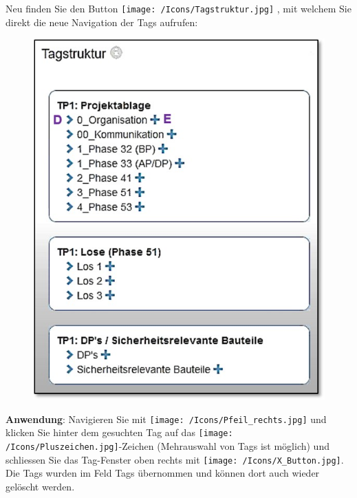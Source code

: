 Neu finden Sie  den Button \texttt{[image: /Icons/Tagstruktur.jpg]} , mit welchem Sie direkt die neue Navigation der Tags aufrufen:


\begin{figure}   %
  \vspace{-23pt}      %
  \begin{center}
    \includegraphics[width=1\linewidth]{../chapters/01_generisch/pictures/04_Dok_Struktur_eingeklappt.jpg}
  \end{center}
  \vspace{-20pt}
  \vspace{-10pt}
\end{figure}

\textbf{Anwendung}: Navigieren Sie mit \texttt{[image: /Icons/Pfeil\_rechts.jpg]}  und klicken Sie hinter dem gesuchten Tag auf das \texttt{[image: /Icons/Pluszeichen.jpg]}-Zeichen  (Mehrauswahl von Tags ist möglich) und schliessen Sie das Tag-Fenster oben rechts mit \texttt{[image: /Icons/X\_Button.jpg]}. Die Tags wurden im Feld Tags übernommen und können dort auch wieder gelöscht werden.

